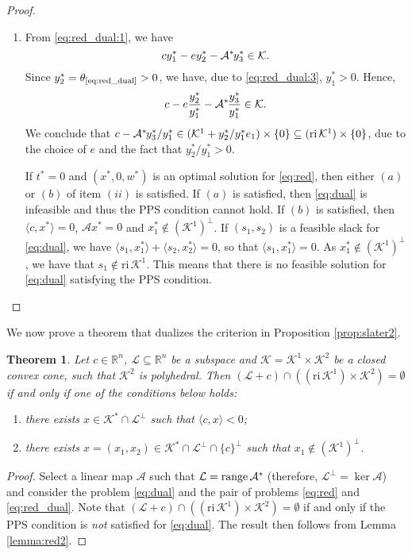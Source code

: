 \documentclass{article}
\newcommand{\reInt}{\mathrm{ri}\,}
\newcommand{\inProd}[2]{\langle #1 , #2 \rangle }
\newcommand{\stdMap}{ {\mathcal{A}}}
\newcommand{\stdCone}{ {\mathcal{K}}}
\newcommand{\stdSpace}{ \mathcal{L}}
\newcommand{\stdInt}{ {e}}
\newcommand{\opt}[1]{ {\theta _{#1}}}
\newcommand{\matRange}{{\mathrm{ range } \,}}
\renewcommand{\Re}{\mathbb{R}}
\newcommand{\PPS}{{PPS}}
\newcommand{\T}{\ast\hspace{-1pt}}
\newtheorem{theorem}[definition]{Theorem}
\begin{document}
\begin{proof}
\begin{enumerate}[label=({\it{\roman*}})]
\item 
\fbox{ $\opt{\text{\ref{eq:red_dual}}} > 0 \Rightarrow $ PPS holds for \eqref{eq:dual}}
From \eqref{eq:red_dual:1}, we have
$$
c y_1^* - \stdInt y_2^* - {\stdMap}^\T y_3^* \in \stdCone.
$$
Since $y_2^*=\opt{\text{\ref{eq:red_dual}}}
>0$, we have, due to \eqref{eq:red_dual:3}, $y_1^* > 0$.
 Hence, 
 $$c - \stdInt \frac{y_2^*}{y_1^*} - {\stdMap}^\T \frac{y_3^*}{y_1^*} \in \stdCone.$$ 
We conclude that 
$c - {\stdMap}^\T y_3^*/y_1^* \in (\stdCone^1 +y_2^*/y_1^* \stdInt_1)\times  \{0\} \subseteq (\reInt \stdCone ^1)\times \{0\}$, due to the choice of  $\stdInt$ and the fact that $y_2^*/y_1^* > 0$. 

\fbox{ $\opt{\text{\ref{eq:red_dual}}} = 0 \Rightarrow $ PPS does not hold for \eqref{eq:dual}  } 
If $t^* = 0$ and $(x^*,0,w^*)$ is an optimal solution 
for \eqref{eq:red}, then either $(a)$ or $(b)$ of item $(ii)$ is satisfied. 
If $(a)$ is satisfied, then \eqref{eq:dual} is infeasible and thus the PPS condition
cannot hold. 
If $(b)$ is satisfied, then $\inProd{c}{x^*} = 0$,
$\stdMap x^* = 0$ and $x_1^* \not \in (\stdCone ^1)^\perp$. If 
$(s_1,s_2)$ is a feasible slack for \eqref{eq:dual}, we have $\inProd{s_1}{x_1^*} + \inProd{s_2}{x_2^*} = 0$, so that 
$\inProd{s_1}{x_1^*} = 0$.  
As $x_1^* \not \in (\stdCone ^1)^\perp$, we have that $s_1 \not \in \reInt \stdCone^1$. This means
that there is no feasible solution for \eqref{eq:dual} satisfying the PPS
condition.
\end{enumerate}
\end{proof}

We now prove a theorem that dualizes the criterion in Proposition \ref{prop:slater2}. 


\begin{theorem}\label{theo:reint_partial}
	Let $c \in \Re^n$, $\stdSpace \subseteq \Re^n$ be a subspace and $\stdCone = \stdCone ^1 \times \stdCone ^2$ be a 
	closed convex cone, such that $\stdCone ^2$ is polyhedral. Then 
	$(\stdSpace+c)\cap ( (\reInt \stdCone ^1) \times \stdCone^2 ) = \emptyset$ if and only if 
	one of the conditions below holds:
	\begin{enumerate}[label=({\alph*})]
		\item there exists $x \in \stdCone^* \cap \stdSpace^\perp$ such that 
		$\inProd{c}{x} < 0$;
		\item  there exists $x = (x_1,x_2) \in \stdCone^* \cap \stdSpace^\perp \cap \{c\}^\perp$ such that 
		$x_1 \not \in (\stdCone ^1)^\perp$.
	\end{enumerate}
\end{theorem}
\begin{proof}
	Select a linear map $\stdMap$ such that $\stdSpace = \matRange \stdMap^\T $ (therefore, $\stdSpace^\perp = \ker \stdMap$) 
	and consider the problem \eqref{eq:dual} and the pair of problems \eqref{eq:red} and \eqref{eq:red_dual}. 
	Note that $(\stdSpace+c)\cap ( (\reInt \stdCone ^1) \times \stdCone^2 ) = \emptyset$ if and 
	only if the {\PPS} condition is \emph{not} satisfied for \eqref{eq:dual}.
	The result then follows from Lemma \ref{lemma:red2}.	
\end{proof}
\end{document}
